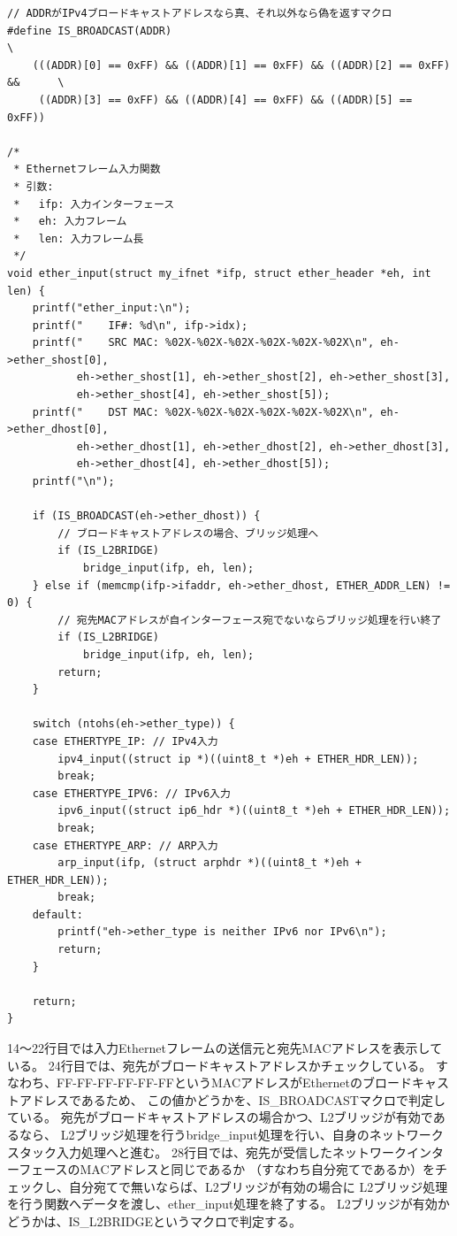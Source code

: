 \begin{lstlisting}[caption=ether\_input関数 (ether.c),label=src:ether_input]
// ADDRがIPv4ブロードキャストアドレスなら真、それ以外なら偽を返すマクロ
#define IS_BROADCAST(ADDR)                                                     \
    (((ADDR)[0] == 0xFF) && ((ADDR)[1] == 0xFF) && ((ADDR)[2] == 0xFF) &&      \
     ((ADDR)[3] == 0xFF) && ((ADDR)[4] == 0xFF) && ((ADDR)[5] == 0xFF))

/*
 * Ethernetフレーム入力関数
 * 引数:
 *   ifp: 入力インターフェース
 *   eh: 入力フレーム
 *   len: 入力フレーム長
 */
void ether_input(struct my_ifnet *ifp, struct ether_header *eh, int len) {
    printf("ether_input:\n");
    printf("    IF#: %d\n", ifp->idx);
    printf("    SRC MAC: %02X-%02X-%02X-%02X-%02X-%02X\n", eh->ether_shost[0],
           eh->ether_shost[1], eh->ether_shost[2], eh->ether_shost[3],
           eh->ether_shost[4], eh->ether_shost[5]);
    printf("    DST MAC: %02X-%02X-%02X-%02X-%02X-%02X\n", eh->ether_dhost[0],
           eh->ether_dhost[1], eh->ether_dhost[2], eh->ether_dhost[3],
           eh->ether_dhost[4], eh->ether_dhost[5]);
    printf("\n");

    if (IS_BROADCAST(eh->ether_dhost)) {
        // ブロードキャストアドレスの場合、ブリッジ処理へ
        if (IS_L2BRIDGE)
            bridge_input(ifp, eh, len);
    } else if (memcmp(ifp->ifaddr, eh->ether_dhost, ETHER_ADDR_LEN) != 0) {
        // 宛先MACアドレスが自インターフェース宛でないならブリッジ処理を行い終了
        if (IS_L2BRIDGE)
            bridge_input(ifp, eh, len);
        return;
    }

    switch (ntohs(eh->ether_type)) {
    case ETHERTYPE_IP: // IPv4入力
        ipv4_input((struct ip *)((uint8_t *)eh + ETHER_HDR_LEN));
        break;
    case ETHERTYPE_IPV6: // IPv6入力
        ipv6_input((struct ip6_hdr *)((uint8_t *)eh + ETHER_HDR_LEN));
        break;
    case ETHERTYPE_ARP: // ARP入力
        arp_input(ifp, (struct arphdr *)((uint8_t *)eh + ETHER_HDR_LEN));
        break;
    default:
        printf("eh->ether_type is neither IPv6 nor IPv6\n");
        return;
    }

    return;
}\end{lstlisting}

14〜22行目では入力Ethernetフレームの送信元と宛先MACアドレスを表示している。
24行目では、宛先がブロードキャストアドレスかチェックしている。
すなわち、FF-FF-FF-FF-FF-FFというMACアドレスがEthernetのブロードキャストアドレスであるため、
この値かどうかを、IS\_BROADCASTマクロで判定している。
宛先がブロードキャストアドレスの場合かつ、L2ブリッジが有効であるなら、
L2ブリッジ処理を行うbridge\_input処理を行い、自身のネットワークスタック入力処理へと進む。
28行目では、宛先が受信したネットワークインターフェースのMACアドレスと同じであるか
（すなわち自分宛てであるか）をチェックし、自分宛てで無いならば、L2ブリッジが有効の場合に
L2ブリッジ処理を行う関数へデータを渡し、ether\_input処理を終了する。
L2ブリッジが有効かどうかは、IS\_L2BRIDGEというマクロで判定する。

